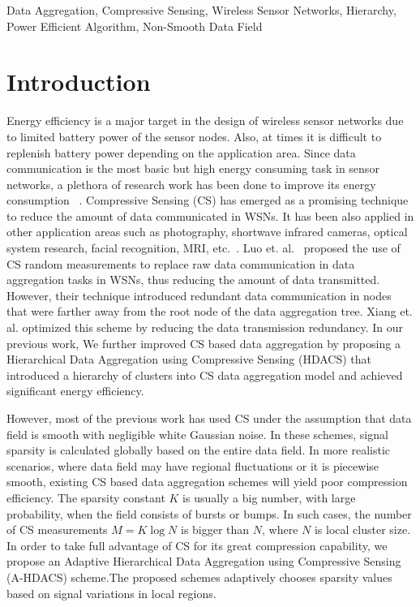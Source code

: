 \documentclass[conference]{IEEEtran}
\begin{document}
\begin{IEEEkeywords}
Data Aggregation, Compressive Sensing, Wireless Sensor Networks, Hierarchy, 
Power Efficient Algorithm, Non-Smooth Data Field
\end{IEEEkeywords}
\IEEEpeerreviewmaketitle


\section{Introduction}
Energy efficiency is a major target in the design of wireless sensor networks due to limited 
battery power of the sensor nodes. Also, at times it is difficult to replenish battery power 
depending on the application area. Since data communication is the most basic but high energy consuming task in 
sensor networks, a plethora of research work has been done to improve its 
energy consumption~\cite{DataAgg} \cite{DataAgg1} \cite{DataAgg2} \cite{DataAgg3}.
Compressive Sensing (CS) \cite{CS} \cite{CS_Richard} has emerged as a promising technique to reduce the amount of data communicated in WSNs.  
It has been also applied in other application areas such as photography, 
shortwave infrared cameras, optical system research, facial recognition, MRI, etc.~\cite{CS_App}.
Luo et. al.~\cite{BalCS} proposed the use of CS random measurements to replace raw data 
communication in data aggregation tasks in WSNs, thus reducing the amount of data transmitted. 
However, their technique introduced redundant data communication in nodes that were farther away 
from the root node of the data aggregation tree.
Xiang et. al.\cite{HybridCS1} \cite{HybridCS2} optimized this scheme 
by reducing the data transmission redundancy.  In our previous work, We further improved CS based data aggregation by proposing a 
Hierarchical Data Aggregation using Compressive Sensing (HDACS) \cite{HDACS}  
that introduced a hierarchy of clusters into CS data aggregation model and achieved 
significant energy efficiency. 

However, most of the previous work has used CS under the assumption that data 
field is smooth with negligible white Gaussian noise. In these schemes, signal 
sparsity is calculated globally based on the entire data field. 
In more realistic scenarios, where data field may have regional fluctuations or it is 
piecewise smooth, existing  CS based data aggregation schemes will yield poor compression efficiency.   
The sparsity constant $K$ is usually a big number, with large probability, 
when the field consists of bursts or bumps. 
In such cases, the number of CS measurements $M=K \log N$ is bigger than $N$, 
where $N$ is local cluster size. In order to take full advantage of CS for its great compression capability,
we propose an Adaptive Hierarchical Data Aggregation using Compressive Sensing
(A-HDACS) scheme.The proposed schemes adaptively chooses sparsity values based on signal variations
in local regions. 
 
\end{document}
